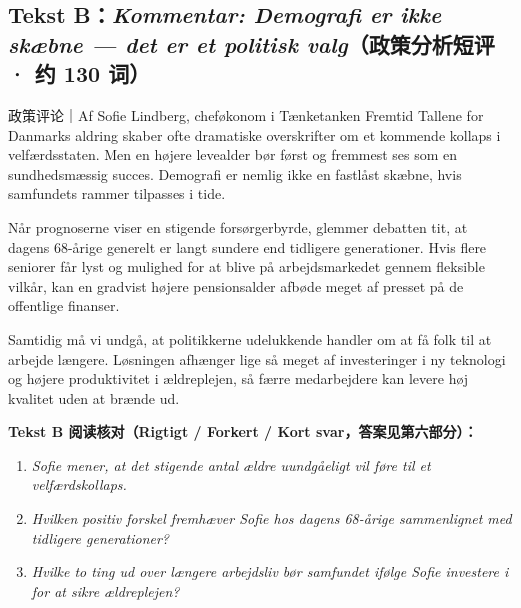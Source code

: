 \subsection*{Tekst B：\textit{Kommentar: Demografi er ikke skæbne --- det er et politisk valg}（政策分析短评 · 约 130 词）}

\begin{emailbox}{政策评论｜Af Sofie Lindberg, cheføkonom i Tænketanken Fremtid}
Tallene for Danmarks aldring skaber ofte dramatiske overskrifter om et kommende kollaps i velfærdsstaten. Men en højere levealder bør først og fremmest ses som en sundhedsmæssig succes. Demografi er nemlig ikke en fastlåst skæbne, hvis samfundets rammer tilpasses i tide.

Når prognoserne viser en stigende forsørgerbyrde, glemmer debatten tit, at dagens 68-årige generelt er langt sundere end tidligere generationer. Hvis flere seniorer får lyst og mulighed for at blive på arbejdsmarkedet gennem fleksible vilkår, kan en gradvist højere pensionsalder afbøde meget af presset på de offentlige finanser.

Samtidig må vi undgå, at politikkerne udelukkende handler om at få folk til at arbejde længere. Løsningen afhænger lige så meget af investeringer i ny teknologi og højere produktivitet i ældreplejen, så færre medarbejdere kan levere høj kvalitet uden at brænde ud.
\end{emailbox}

\textbf{Tekst B 阅读核对（Rigtigt / Forkert / Kort svar，答案见第六部分）：}
\begin{enumerate}
  \item \textit{Sofie mener, at det stigende antal ældre uundgåeligt vil føre til et velfærdskollaps.} \underline{\hspace{2.2cm}}
  \item \textit{Hvilken positiv forskel fremhæver Sofie hos dagens 68-årige sammenlignet med tidligere generationer?} \underline{\hspace{2.2cm}}
  \item \textit{Hvilke to ting ud over længere arbejdsliv bør samfundet ifølge Sofie investere i for at sikre ældreplejen?} \underline{\hspace{2.2cm}}
\end{enumerate}

